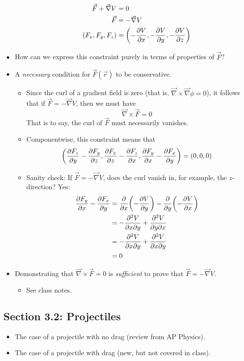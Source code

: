 \documentclass[../notes.tex]{subfiles}
\begin{document}
\begin{itemize}
\begin{itemize}
\begin{align*}
            \vec{F}+\vec{\nabla}V &= 0\\
            \vec{F} &= -\vec{\nabla}V\\
            (F_x,F_y,F_z) &= \left( -\pdv{V}{x},-\pdv{V}{y},-\pdv{V}{z} \right)
        \end{align*}
    \end{itemize}
    \item How can we express this constraint purely in terms of properties of $\vec{F}$?
    \item A \emph{necessary} condition for $\vec{F}(\vec{r})$ to be conservative.
    \begin{itemize}
        \item Since the curl of a gradient field is zero (that is, $\vec{\nabla}\times\vec{\nabla}\phi=0$), it follows that if $\vec{F}=-\vec{\nabla}V$, then we must have
        \begin{equation*}
            \vec{\nabla}\times\vec{F} = 0
        \end{equation*}
        That is to say, the curl of $\vec{F}$ must necessarily vanishes.
        \item Componentwise, this constraint means that
        \begin{equation*}
            \left( \pdv{F_z}{y}-\pdv{F_y}{z},\pdv{F_x}{z}-\pdv{F_z}{x},\pdv{F_y}{x}-\pdv{F_x}{y} \right) = (0,0,0)
        \end{equation*}
        \item Sanity check: If $\vec{F}=-\vec{\nabla}V$, does the curl vanish in, for example, the $z$-direction? Yes:
        \begin{align*}
            \pdv{F_y}{x}-\pdv{F_x}{y} &= \pdv{x}(-\pdv{V}{y})-\pdv{y}(-\pdv{V}{x})\\
            &= -\pdv{V}{x}{y}+\pdv{V}{y}{x}\\
            &= -\pdv{V}{x}{y}+\pdv{V}{x}{y}\\
            &= 0
        \end{align*}
    \end{itemize}
    \item Demonstrating that $\vec{\nabla}\times\vec{F}=0$ is \emph{sufficient} to prove that $\vec{F}=-\vec{\nabla}V$.
    \begin{itemize}
        \item See class notes.
    \end{itemize}
\end{itemize}


\subsection*{Section 3.2: Projectiles}
\begin{itemize}
    \item The case of a projectile with no drag (review from AP Physics).
    \item The case of a projectile with drag (new, but not covered in class).
\end{itemize}
\end{document}
